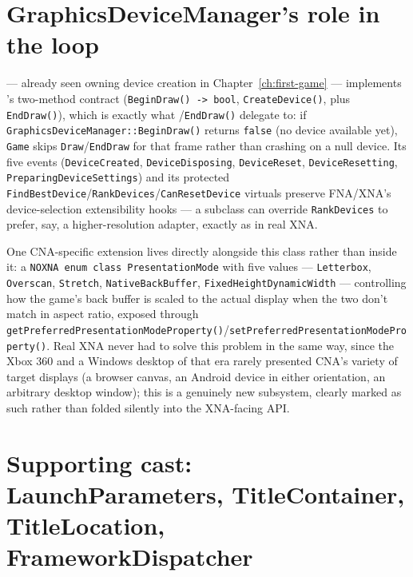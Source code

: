 \section{GraphicsDeviceManager's role in the loop}
\label{sec:graphicsdevicemanager-in-loop}

 --- already seen owning device creation in
Chapter~\ref{ch:first-game} --- implements 's two-method
contract (\texttt{BeginDraw() -> bool}, \texttt{CreateDevice()}, plus \texttt{EndDraw()}),
which is exactly what /\texttt{EndDraw()} delegate to: if
\texttt{GraphicsDeviceManager::BeginDraw()} returns \texttt{false} (no device available yet),
\texttt{Game} skips \texttt{Draw}/\texttt{EndDraw} for that frame rather than crashing on a
null device. Its five events (\texttt{DeviceCreated}, \texttt{DeviceDisposing},
\texttt{DeviceReset}, \texttt{DeviceResetting}, \texttt{PreparingDeviceSettings}) and its
protected \texttt{FindBestDevice}/\texttt{RankDevices}/\texttt{CanResetDevice} virtuals
preserve FNA/XNA's device-selection extensibility hooks --- a subclass can override
\texttt{RankDevices} to prefer, say, a higher-resolution adapter, exactly as in real XNA.

One CNA-specific extension lives directly alongside this class rather than inside it: a
\texttt{NOXNA enum class PresentationMode} with five values ---
\texttt{Letterbox}, \texttt{Overscan}, \texttt{Stretch}, \texttt{NativeBackBuffer},
\texttt{FixedHeightDynamicWidth} --- controlling how the game's back buffer is scaled to the
actual display when the two don't match in aspect ratio, exposed through
\texttt{getPreferredPresentationModeProperty()}/\texttt{setPreferredPresentationModeProperty()}.
Real XNA never had to solve this problem in the same way, since the Xbox 360 and a Windows
desktop of that era rarely presented CNA's variety of target displays (a browser canvas, an
Android device in either orientation, an arbitrary desktop window); this is a genuinely new
subsystem, clearly marked as such rather than folded silently into the XNA-facing API.

\section{Supporting cast: LaunchParameters, TitleContainer, TitleLocation, FrameworkDispatcher}

